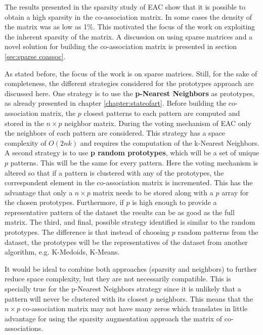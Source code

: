 The results presented in the sparsity study of EAC \cite{Lourenco2010} show that it is possible to obtain a high sparsity in the co-association matrix.
In some cases the density of the matrix was as low as 1\%.
This motivated the focus of the work on exploiting the inherent sparsity of the matrix.
A discussion on using sparse matrices and a novel solution for building the co-association matrix is presented in section \ref{sec:sparse coassoc}.

As stated before, the focus of the work is on sparse matrices.
Still, for the sake of completeness, the different strategies considered for the prototypes approach are discussed here.
One strategy is to use the \textbf{p-Nearest Neighbors} as prototypes, as already presented in chapter \ref{chapter:stateofart}.
Before building the co-association matrix, the $p$ closest patterns to each pattern are computed and stored in the $n \times p$ neighbor matrix.
During the voting mechanism of EAC only the neighbors of each pattern are considered.
This strategy has a space complexity of $O(2nk)$ and requires the computation of the k-Nearest Neighbors.
A second strategy is to use \textbf{p random prototypes}, which will be a set of unique $p$ patterns.
This will be the same for every pattern.
Here the voting mechanism is altered so that if a pattern is clustered with any of the prototypes, the correspondent element in the co-association matrix is incremented.
This has the advantage that only a $n \times p$ matrix needs to be stored along with a $p$ array for the chosen prototypes.
Furthermore, if $p$ is high enough to provide a representative pattern of the dataset the results can be as good as the full matrix.
The third, and final, possible strategy identified is similar to the random prototypes.
The difference is that instead of choosing $p$ random patterns from the dataset, the prototypes will be the representatives of the dataset from another algorithm, e.g. K-Medoids, K-Means.

It would be ideal to combine both approaches (sparsity and neighbors) to further reduce space complexity, but they are not necessarily compatible.
This is specially true for the p-Nearest Neighbors strategy since it is unlikely that a pattern will never be clustered with its closest $p$ neighbors.
This means that the $n \times p$ co-association matrix may not have many zeros which translates in little advantage for using the sparsity augmentation approach the matrix of co-associations.

